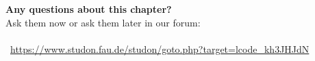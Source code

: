 \begin{frame}[c]
	\begin{center}
		{\bf Any questions about this chapter?}\\[0.5cm]
		Ask them now or ask them later in our forum: \\\bigskip
		 \\
		\vspace*{0.5cm}
		\faLink\ \url{https://www.studon.fau.de/studon/goto.php?target=lcode_kh3JHJdN} \smallskip

	\end{center}
\end{frame}

